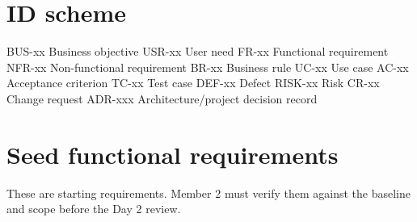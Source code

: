\documentclass[
  10pt,
  a4paper,
  oneside]{report}
\newenvironment{Shaded}{}{}
\newcommand{\NormalTok}[1]{#1}
\begin{document}
\section{ID scheme}\label{141-id-scheme}

\begin{Shaded}
\begin{Highlighting}[]
\NormalTok{BUS{-}xx   Business objective}
\NormalTok{USR{-}xx   User need}
\NormalTok{FR{-}xx    Functional requirement}
\NormalTok{NFR{-}xx   Non{-}functional requirement}
\NormalTok{BR{-}xx    Business rule}
\NormalTok{UC{-}xx    Use case}
\NormalTok{AC{-}xx    Acceptance criterion}
\NormalTok{TC{-}xx    Test case}
\NormalTok{DEF{-}xx   Defect}
\NormalTok{RISK{-}xx  Risk}
\NormalTok{CR{-}xx    Change request}
\NormalTok{ADR{-}xxx  Architecture/project decision record}
\end{Highlighting}
\end{Shaded}

\section{Seed functional
requirements}\label{142-seed-functional-requirements}

These are starting requirements. Member 2 must verify them against the
baseline and scope before the Day 2 review.
\end{document}

